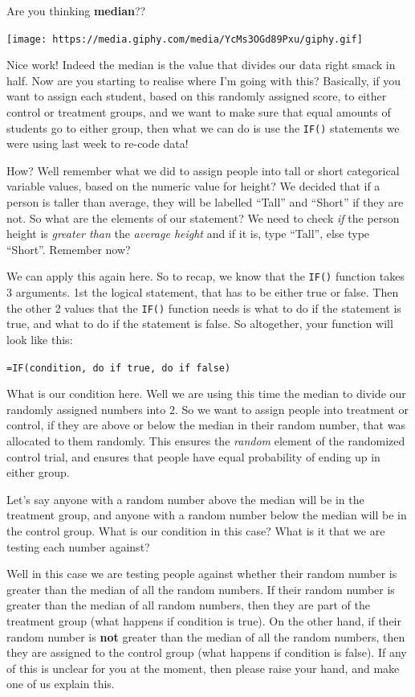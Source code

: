 \documentclass[]{book}
\theoremstyle{definition}
\theoremstyle{definition}
\theoremstyle{definition}
\theoremstyle{remark}
\begin{document}
Are you thinking \textbf{median}??

\texttt{[image: https://media.giphy.com/media/YcMs3OGd89Pxu/giphy.gif]}

Nice work! Indeed the median is the value that divides our data right
smack in half. Now are you starting to realise where I'm going with
this? Basically, if you want to assign each student, based on this
randomly assigned score, to either control or treatment groups, and we
want to make sure that equal amounts of students go to either group,
then what we can do is use the \texttt{IF()} statements we were using
last week to re-code data!

How? Well remember what we did to assign people into tall or short
categorical variable values, based on the numeric value for height? We
decided that if a person is taller than average, they will be labelled
``Tall'' and ``Short'' if they are not. So what are the elements of our
statement? We need to check \emph{if} the person height is \emph{greater
than} the \emph{average height} and if it is, type ``Tall'', else type
``Short''. Remember now?

We can apply this again here. So to recap, we know that the
\texttt{IF()} function takes 3 arguments. 1st the logical statement,
that has to be either true or false. Then the other 2 values that the
\texttt{IF()} function needs is what to do if the statement is true, and
what to do if the statement is false. So altogether, your function will
look like this:

\texttt{=IF(condition,\ do\ if\ true,\ do\ if\ false)}

What is our condition here. Well we are using this time the median to
divide our randomly assigned numbers into 2. So we want to assign people
into treatment or control, if they are above or below the median in
their random number, that was allocated to them randomly. This ensures
the \emph{random} element of the randomized control trial, and ensures
that people have equal probability of ending up in either group.

Let's say anyone with a random number above the median will be in the
treatment group, and anyone with a random number below the median will
be in the control group. What is our condition in this case? What is it
that we are testing each number against?

Well in this case we are testing people against whether their random
number is greater than the median of all the random numbers. If their
random number is greater than the median of all random numbers, then
they are part of the treatment group (what happens if condition is
true). On the other hand, if their random number is \textbf{not} greater
than the median of all the random numbers, then they are assigned to the
control group (what happens if condition is false). If any of this is
unclear for you at the moment, then please raise your hand, and make one
of us explain this.
\end{document}
